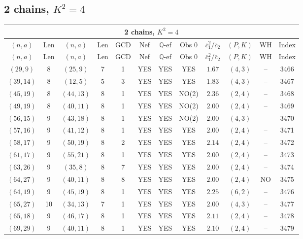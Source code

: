 \subsection{2 chains, $K^2 = 4$}
\begin{longtable}{|c|c|c|c|c|c|c|c|c|c|c|c|}
\hline
\multicolumn{12}{|c|}{2 chains, $K^2 = 4$}\\
\hline
$(n,a)$ & Len & $(n,a)$ & Len & GCD & Nef & $\mathbb Q$-ef & Obs 0 & $\overline c_1^2 / \overline c_2$ & $(P,K)$ & WH & Index\\
\hline
\endfirsthead

\hline
$(n,a)$ & Len & $(n,a)$ & Len & GCD & Nef & $\mathbb Q$-ef & Obs 0 & $\overline c_1^2 / \overline c_2$ & $(P,K)$ & WH & Index\\
\hline
\endhead
\hline
\endfoot

$(29,9)$ & 8 & $(25,9)$ & 7 & 1 & YES & YES & YES & $1.67$ & $(4,3)$ & -- & 3466\\
$(39,14)$ & 8 & $(12,5)$ & 5 & 3 & YES & YES & YES & $1.83$ & $(4,3)$ & -- & 3467\\
$(45,19)$ & 8 & $(44,13)$ & 8 & 1 & YES & YES & NO(2) & $2.36$ & $(2,4)$ & -- & 3468\\
$(49,19)$ & 8 & $(40,11)$ & 8 & 1 & YES & YES & NO(2) & $2.00$ & $(2,4)$ & -- & 3469\\
$(56,15)$ & 9 & $(43,18)$ & 8 & 1 & YES & YES & NO(2) & $2.00$ & $(4,3)$ & -- & 3470\\
$(57,16)$ & 9 & $(41,12)$ & 8 & 1 & YES & YES & YES & $2.00$ & $(2,4)$ & -- & 3471\\
$(58,17)$ & 9 & $(50,19)$ & 8 & 2 & YES & YES & YES & $2.14$ & $(2,4)$ & -- & 3472\\
$(61,17)$ & 9 & $(55,21)$ & 8 & 1 & YES & YES & YES & $2.00$ & $(2,4)$ & -- & 3473\\
$(63,26)$ & 9 & $(35,8)$ & 8 & 7 & YES & YES & YES & $2.00$ & $(2,4)$ & -- & 3474\\
$(64,27)$ & 9 & $(40,11)$ & 8 & 8 & YES & YES & YES & $2.00$ & $(2,4)$ & NO & 3475\\
$(64,19)$ & 9 & $(45,19)$ & 8 & 1 & YES & YES & YES & $2.25$ & $(6,2)$ & -- & 3476\\
$(65,27)$ & 10 & $(34,13)$ & 7 & 1 & YES & YES & YES & $2.00$ & $(4,3)$ & -- & 3477\\
$(65,18)$ & 9 & $(46,17)$ & 8 & 1 & YES & YES & YES & $2.11$ & $(2,4)$ & -- & 3478\\
$(69,29)$ & 9 & $(40,11)$ & 8 & 1 & YES & YES & YES & $2.10$ & $(2,4)$ & -- & 3479\\

\end{longtable}
